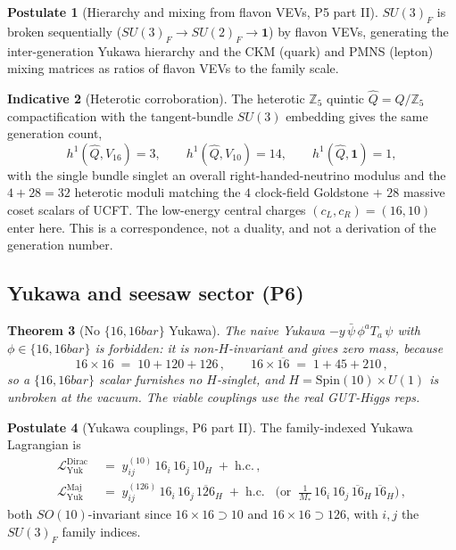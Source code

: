 \documentclass[11pt]{article}
\theoremstyle{plain}
\newtheorem{theorem}{Theorem}[section]
\theoremstyle{definition}
\newtheorem{postulate}[theorem]{Postulate}
\newtheorem{indicative}[theorem]{Indicative}
\theoremstyle{remark}
\begin{document}
\begin{postulate}[Hierarchy and mixing from flavon VEVs, P5 part II]\label{post:sm:flavons}
$SU(3)_F$ is broken sequentially ($SU(3)_F\to SU(2)_F\to \mathbf{1}$) by flavon VEVs,
generating the inter-generation Yukawa hierarchy and the CKM (quark) and PMNS (lepton)
mixing matrices as ratios of flavon VEVs to the family scale.
\end{postulate}

\begin{indicative}[Heterotic corroboration]\label{ind:sm:heterotic}
The heterotic $\mathbb{Z}_5$ quintic $\hat Q=Q/\mathbb{Z}_5$ compactification with the
tangent-bundle $SU(3)$ embedding gives the same generation count,
\begin{equation}\label{eq:sm:het}
h^1(\hat Q,V_{16})=3,\qquad h^1(\hat Q,V_{10})=14,\qquad h^1(\hat Q,\mathbf{1})=1,
\end{equation}
with the single bundle singlet an overall right-handed-neutrino modulus and the
$4+28=32$ heterotic moduli matching the $4$ clock-field Goldstone $+$ $28$ massive
coset scalars of UCFT. The low-energy central charges $(c_L,c_R)=(16,10)$ enter here.
This is a correspondence, not a duality, and not a derivation of the generation number.
\end{indicative}

\subsection{Yukawa and seesaw sector (P6)}
\label{sec:sm:yukawa}

\begin{theorem}[No $\{16,16bar\}$ Yukawa]\label{thm:sm:noyukawa}
The naive Yukawa $-y\,\bar\psi\,\phi^a T_a\,\psi$ with $\phi\in\{16,16bar\}$ is
forbidden: it is non-$H$-invariant and gives zero mass, because
\begin{equation}\label{eq:sm:tensor}
16\times 16 \;=\; 10+120+126\,,
\qquad
16\times \overline{16} \;=\; 1+45+210\,,
\end{equation}
so a $\{16,16bar\}$ scalar furnishes no $H$-singlet, and $H=\mathrm{Spin}(10)\times
U(1)$ is unbroken at the vacuum. The viable couplings use the real GUT-Higgs reps.
\end{theorem}

\begin{postulate}[Yukawa couplings, P6 part II]\label{post:sm:P6yukawa}
The family-indexed Yukawa Lagrangian is
\begin{align}
\mathcal{L}^{\mathrm{Dirac}}_{\mathrm{Yuk}}
 &\;=\; y^{(10)}_{ij}\,16_i\,16_j\,10_H \;+\; \mathrm{h.c.}\,,
 \label{eq:sm:Ldirac}\\
\mathcal{L}^{\mathrm{Maj}}_{\mathrm{Yuk}}
 &\;=\; y^{(126)}_{ij}\,16_i\,16_j\,\overline{126}_H \;+\; \mathrm{h.c.}
 \;\;\;\Big(\text{or}\;\; \tfrac{1}{M_*}\,16_i\,16_j\,\overline{16}_H\,\overline{16}_H\Big)\,,
 \label{eq:sm:Lmaj}
\end{align}
both $SO(10)$-invariant since $16\times 16\supset 10$ and $16\times 16\supset 126$,
with $i,j$ the $SU(3)_F$ family indices.
\end{postulate}
\end{document}
